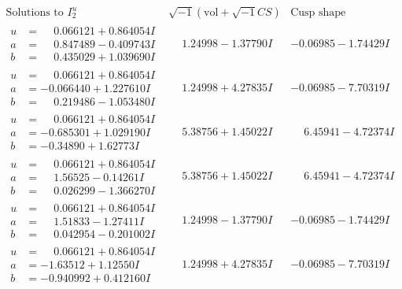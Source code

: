 \documentclass[1p]{elsarticle_modified}
\theoremstyle{definition}
\newcommand{\I}{\sqrt{-1}}
\begin{document}
$$\begin{array}{c|c|c}  
\text{Solutions to }I^u_{2}& \I (\text{vol} + \sqrt{-1}CS) & \text{Cusp shape}\\
 \hline 
\begin{aligned}
u &= \phantom{-}0.066121 + 0.864054 I \\
a &= \phantom{-}0.847489 - 0.409743 I \\
b &= \phantom{-}0.435029 + 1.039690 I\end{aligned}
 & \phantom{-}1.24998 - 1.37790 I & -0.06985 - 1.74429 I \\ \hline\begin{aligned}
u &= \phantom{-}0.066121 + 0.864054 I \\
a &= -0.066440 + 1.227610 I \\
b &= \phantom{-}0.219486 - 1.053480 I\end{aligned}
 & \phantom{-}1.24998 + 4.27835 I & -0.06985 - 7.70319 I \\ \hline\begin{aligned}
u &= \phantom{-}0.066121 + 0.864054 I \\
a &= -0.685301 + 1.029190 I \\
b &= -0.34890 + 1.62773 I\end{aligned}
 & \phantom{-}5.38756 + 1.45022 I & \phantom{-}6.45941 - 4.72374 I \\ \hline\begin{aligned}
u &= \phantom{-}0.066121 + 0.864054 I \\
a &= \phantom{-}1.56525 - 0.14261 I \\
b &= \phantom{-}0.026299 - 1.366270 I\end{aligned}
 & \phantom{-}5.38756 + 1.45022 I & \phantom{-}6.45941 - 4.72374 I \\ \hline\begin{aligned}
u &= \phantom{-}0.066121 + 0.864054 I \\
a &= \phantom{-}1.51833 - 1.27411 I \\
b &= \phantom{-}0.042954 - 0.201002 I\end{aligned}
 & \phantom{-}1.24998 - 1.37790 I & -0.06985 - 1.74429 I \\ \hline\begin{aligned}
u &= \phantom{-}0.066121 + 0.864054 I \\
a &= -1.63512 + 1.12550 I \\
b &= -0.940992 + 0.412160 I\end{aligned}
 & \phantom{-}1.24998 + 4.27835 I & -0.06985 - 7.70319 I \\ \hline\begin{aligned}

\end{aligned}
\end{array}$$
\end{document}
